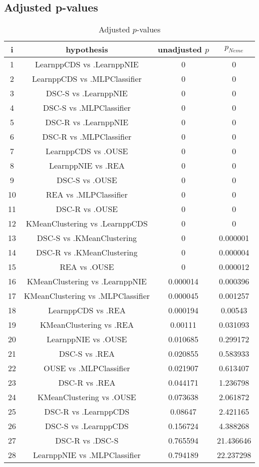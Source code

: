 \documentclass[a4paper,10pt]{article}
\begin{document}
\begin{landscape}
\pagebreak

\subsection{Adjusted p-values}

\begin{table}[!htp]
\centering\scriptsize
\begin{tabular}{cccc}
i&hypothesis&unadjusted $p$&$p_{Neme}$\\
\hline1&LearnppCDS vs .LearnppNIE&0&0\\
2&LearnppCDS vs .MLPClassifier&0&0\\
3&DSC-S vs .LearnppNIE&0&0\\
4&DSC-S vs .MLPClassifier&0&0\\
5&DSC-R vs .LearnppNIE&0&0\\
6&DSC-R vs .MLPClassifier&0&0\\
7&LearnppCDS vs .OUSE&0&0\\
8&LearnppNIE vs .REA&0&0\\
9&DSC-S vs .OUSE&0&0\\
10&REA vs .MLPClassifier&0&0\\
11&DSC-R vs .OUSE&0&0\\
12&KMeanClustering vs .LearnppCDS&0&0\\
13&DSC-S vs .KMeanClustering&0&0.000001\\
14&DSC-R vs .KMeanClustering&0&0.000004\\
15&REA vs .OUSE&0&0.000012\\
16&KMeanClustering vs .LearnppNIE&0.000014&0.000396\\
17&KMeanClustering vs .MLPClassifier&0.000045&0.001257\\
18&LearnppCDS vs .REA&0.000194&0.00543\\
19&KMeanClustering vs .REA&0.00111&0.031093\\
20&LearnppNIE vs .OUSE&0.010685&0.299172\\
21&DSC-S vs .REA&0.020855&0.583933\\
22&OUSE vs .MLPClassifier&0.021907&0.613407\\
23&DSC-R vs .REA&0.044171&1.236798\\
24&KMeanClustering vs .OUSE&0.073638&2.061872\\
25&DSC-R vs .LearnppCDS&0.08647&2.421165\\
26&DSC-S vs .LearnppCDS&0.156724&4.388268\\
27&DSC-R vs .DSC-S&0.765594&21.436646\\
28&LearnppNIE vs .MLPClassifier&0.794189&22.237298\\
\hline
\end{tabular}
\caption{Adjusted $p$-values}
\end{table}

\end{landscape}
\end{document}
